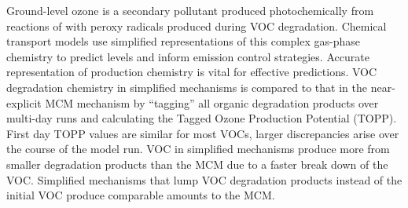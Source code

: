 Ground-level ozone is a secondary pollutant produced photochemically from reactions of  with peroxy radicals produced during VOC degradation. 
Chemical transport models use simplified representations of this complex gas-phase chemistry to predict  levels and inform emission control strategies. 
Accurate representation of  production chemistry is vital for effective predictions.
VOC degradation chemistry in simplified mechanisms is compared to that in the near-explicit MCM mechanism by ``tagging'' all organic degradation products over multi-day runs and calculating the Tagged Ozone Production Potential (TOPP). 
First day TOPP values are similar for most VOCs, larger discrepancies arise over the course of the model run. 
VOC in simplified mechanisms produce more  from smaller degradation products than the MCM due to a faster break down of the VOC.
Simplified mechanisms that lump VOC degradation products instead of the initial VOC produce comparable  amounts to the MCM.
